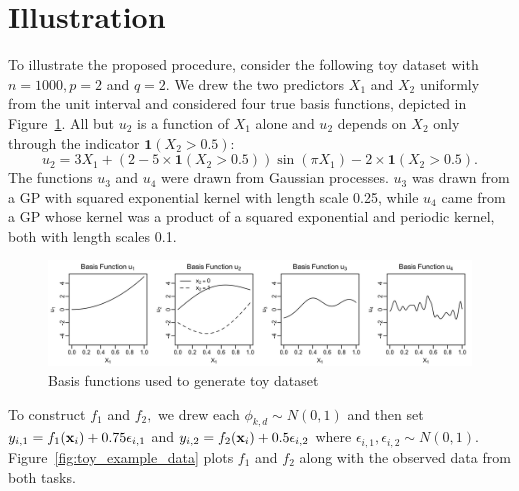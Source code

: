 \documentclass[12pt]{article}
\begin{document}
\section{Illustration}

To illustrate the proposed procedure, consider the following toy dataset with $n = 1000, p = 2$ and $q = 2.$
We drew the two predictors $X_{1}$ and $X_{2}$ uniformly from the unit interval and considered four true basis functions, depicted in Figure~\ref{fig:toy_example_basis}.
All but $u_{2}$ is a function of $X_{1}$ alone and $u_{2}$ depends on $X_{2}$ only through the indicator $\mathbf{1}(X_{2} > 0.5)$:
$$
u_{2} = 3X_{1} + (2 - 5\times\mathbf{1}(X_{2} > 0.5))\sin\left(\pi X_{1}\right) - 2\times \mathbf{1}(X_{2} > 0.5).
$$
The functions $u_{3}$ and $u_{4}$ were drawn from Gaussian processes.
$u_{3}$ was drawn from a GP with squared exponential kernel with length scale 0.25, while $u_{4}$ came from a GP whose kernel was a product of a squared exponential and periodic kernel, both with length scales 0.1.

\begin{figure}[H]
\centering
\includegraphics[width = \textwidth]{../images/toy_example_basis.png}
\caption{Basis functions used to generate toy dataset}
\label{fig:toy_example_basis}
\end{figure}

To construct $f_{1}$ and $f_{2},$ we drew each $\phi_{k,d} \sim N(0,1)$ and then set $y_{i,1} = f_{1}(\mathbf{x}_{i}) + 0.75\epsilon_{i,1}$ and $y_{i,2} = f_{2}(\mathbf{x}_{i}) + 0.5\epsilon_{i,2}$ where $\epsilon_{i,1}, \epsilon_{i,2} \sim N(0,1).$
Figure~\ref{fig:toy_example_data} plots $f_{1}$ and $f_{2}$ along with the observed data from both tasks.
\end{document}

